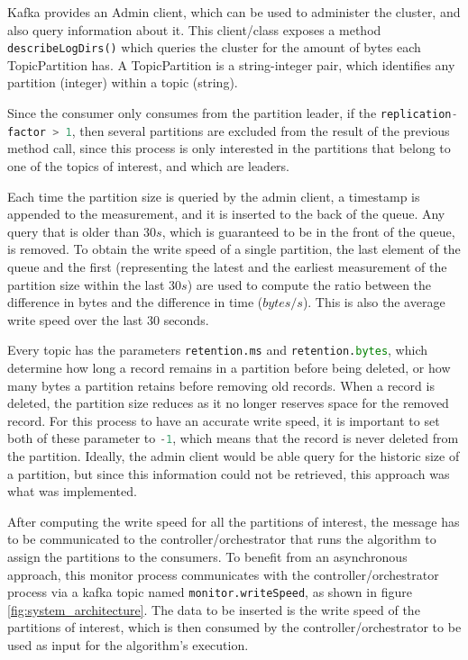 Kafka provides an Admin client, which can be used to administer the cluster, and
also query information about it. This client/class exposes a method
\lstinline[language=Python]{describeLogDirs()} which queries the cluster for the
amount of bytes each TopicPartition has. A TopicPartition is a string-integer
pair, which identifies any partition (integer) within a topic (string). 

Since the consumer only consumes from the partition leader, if the
\lstinline[language=Python]{replication-factor > 1}, then several partitions are
excluded from the result of the previous method call, since this process is only
interested in the partitions that belong to one of the topics of interest, and
which are leaders.

Each time the partition size is queried by the admin client, a timestamp is
appended to the measurement, and it is inserted to the back of the queue. Any
query that is older than $30s$, which is guaranteed to be in the front of the
queue, is removed. To obtain the write speed of a single partition, the last
element of the queue and the first (representing the latest and the earliest
measurement of the partition size within the last $30s$) are used to compute the
ratio between the difference in bytes and the difference in time ($bytes/s$).
This is also the average write speed over the last 30 seconds.

Every topic has the parameters \lstinline[language=Python]{retention.ms} and
\lstinline[language=Python]{retention.bytes}, which determine how long a record
remains in a partition before being deleted, or how many bytes a partition
retains before removing old records. When a record is deleted, the partition
size reduces as it no longer reserves space for the removed record. For this
process to have an accurate write speed, it is important to set both of these
parameter to \lstinline[language=Python]{-1}, which means that the record is
never deleted from the partition. Ideally, the admin client would be able query
for the historic size of a partition, but since this information could not be
retrieved, this approach was what was implemented.

After computing the write speed for all the partitions of interest, the message
has to be communicated to the controller/orchestrator that runs the algorithm to
assign the partitions to the consumers. To benefit from an asynchronous
approach, this monitor process communicates with the controller/orchestrator
process via a kafka topic named
\lstinline[language=Python]{monitor.writeSpeed}, as shown in figure
\ref{fig:system_architecture}. The data to be inserted
is the write speed of the partitions of interest, which is then consumed by the
controller/orchestrator to be used as input for the algorithm's execution.

